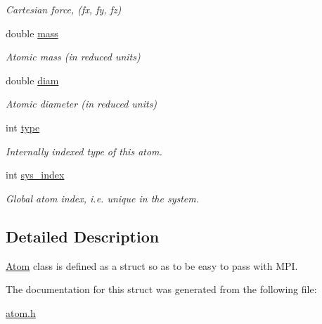 \begin{DoxyCompactItemize}
\begin{DoxyCompactList}\small\item\em Cartesian force, (fx, fy, fz) \end{DoxyCompactList}\item 
\hypertarget{structAtom_a90e6f00ca3ae2fda9b87cb27aac5929d}{double \hyperlink{structAtom_a90e6f00ca3ae2fda9b87cb27aac5929d}{mass}}\label{structAtom_a90e6f00ca3ae2fda9b87cb27aac5929d}

\begin{DoxyCompactList}\small\item\em Atomic mass (in reduced units) \end{DoxyCompactList}\item 
\hypertarget{structAtom_adc9135600cf2007211e760b6005e1a18}{double \hyperlink{structAtom_adc9135600cf2007211e760b6005e1a18}{diam}}\label{structAtom_adc9135600cf2007211e760b6005e1a18}

\begin{DoxyCompactList}\small\item\em Atomic diameter (in reduced units) \end{DoxyCompactList}\item 
\hypertarget{structAtom_a7c2770b985ea2d1615ab750fba4d45b8}{int \hyperlink{structAtom_a7c2770b985ea2d1615ab750fba4d45b8}{type}}\label{structAtom_a7c2770b985ea2d1615ab750fba4d45b8}

\begin{DoxyCompactList}\small\item\em Internally indexed type of this atom. \end{DoxyCompactList}\item 
\hypertarget{structAtom_a7a297229ec0e4988ee6620f2caf3f572}{int \hyperlink{structAtom_a7a297229ec0e4988ee6620f2caf3f572}{sys\-\_\-index}}\label{structAtom_a7a297229ec0e4988ee6620f2caf3f572}

\begin{DoxyCompactList}\small\item\em Global atom index, i.\-e. unique in the system. \end{DoxyCompactList}\end{DoxyCompactItemize}


\subsection{Detailed Description}
\hyperlink{structAtom}{Atom} class is defined as a struct so as to be easy to pass with M\-P\-I. 

The documentation for this struct was generated from the following file\-:\begin{DoxyCompactItemize}
\item 
\hyperlink{atom_8h}{atom.\-h}\end{DoxyCompactItemize}
